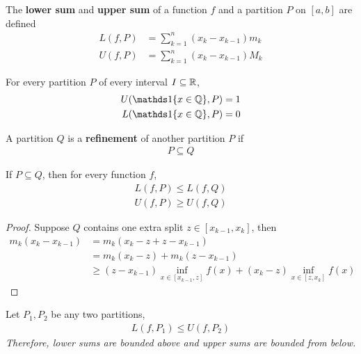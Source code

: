 \documentclass[11pt]{article}
\begin{document}
	\begin{definition}
		The \textbf{lower sum} and \textbf{upper sum} of a function $f$ and a partition $P$ on $[a, b]$ are defined 
		\begin{align}
			L(f, P) &= \sum_{k=1}^n (x_k - x_{k-1}) m_k \\
			U(f, P) &= \sum_{k=1}^n (x_k - x_{k-1}) M_k
		\end{align}
	\end{definition}
	
	\begin{example}
		For every partition $P$ of every interval $I \subseteq \mathbb{R}$,
		\begin{align}
			U(\id{x \in \Q}, P) = 1\\
			L(\id{x \in \Q}, P) = 0
		\end{align}
	\end{example}
	
	\begin{definition}
		A partition $Q$ is a \textbf{refinement} of another partition $P$ if 
		\begin{align}
			P \subseteq Q
		\end{align}
	\end{definition}
	
	\begin{lemma}
		If $P \subseteq Q$, then for every function $f$,
		\begin{align}
			L(f, P) \leq L(f, Q) \\
			U(f, P) \geq U(f, Q)
		\end{align}
	\end{lemma}
	
	\begin{proof}
		Suppose $Q$ contains one extra split $z \in [x_{k-1}, x_k]$, then 
		\begin{align}
			m_k(x_k - x_{k-1}) &= m_k(x_k - z + z - x_{k-1}) \\
			&= m_k(x_k - z) + m_k(z - x_{k-1}) \\
			&\geq 
			(z - x_{k-1}) \inf_{x \in [x_{k-1}, z]} f(x)
			+
			(x_k - z) \inf_{x \in [z, x_k]} f(x)
		\end{align}
	\end{proof}
	
	\begin{lemma}
		Let $P_1, P_2$ be any two partitions,
		\begin{align}
			L(f, P_1) \leq U(f, P_2)
		\end{align}
		\emph{Therefore, lower sums are bounded above and upper sums are bounded from below.}
	\end{lemma}
	
\end{document}
